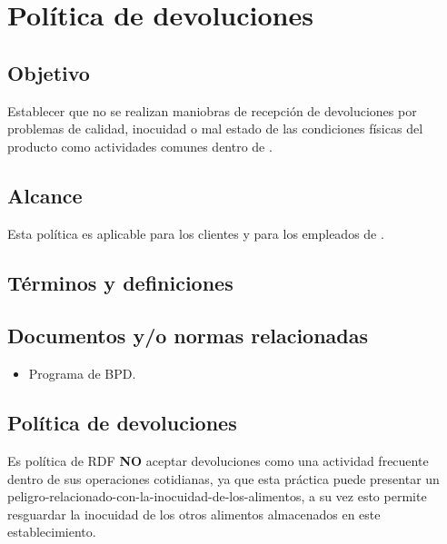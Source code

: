 \renewcommand{\MayorVer}{2}
\renewcommand{\MenorVer}{1}
\renewcommand{\Codigo}{PSA-1-PROG} %
\renewcommand{\FechaPub}{2023--01}
\renewcommand{\Titulo}{Política de devoluciones}

\section{\Titulo}


\subsection{Objetivo}

Establecer que no se realizan maniobras de recepción de devoluciones por problemas de calidad, inocuidad o mal estado de las condiciones físicas del producto como actividades comunes dentro de .

\subsection{Alcance}

Esta política es aplicable para los clientes y para los empleados de .

\subsection{Términos y definiciones}

\begin{description}
\end{description}

\subsection{Documentos y/o normas relacionadas}
\begin{itemize}
	\item Programa de \gls{BPD}.
\end{itemize}

\subsection{Política de devoluciones}
Es política de \Gls{RDF} \textbf{NO} aceptar devoluciones como una actividad frecuente dentro de sus operaciones cotidianas, ya que esta práctica puede presentar un \gls{peligro-relacionado-con-la-inocuidad-de-los-alimentos}, a su vez esto permite resguardar la inocuidad de los otros \glspl{alimento} almacenados en este establecimiento.

